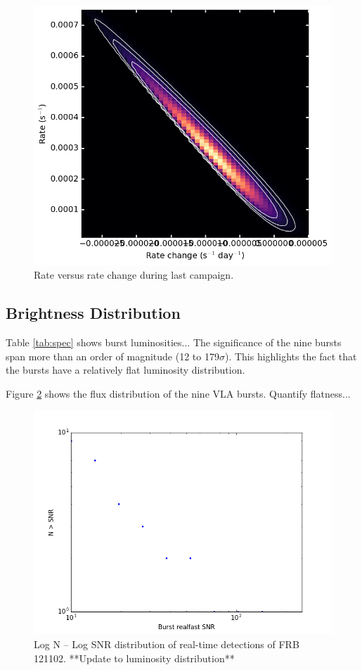 \documentclass[twocolumn]{aastex61}
\begin{document}
\begin{figure}[htb]
\begin{center}
\includegraphics[width=0.9\columnwidth]{event_rate_contours}
\caption{Rate versus rate change during last campaign.
\label{fig:rate}}
\end{center}
\end{figure}

\subsection{Brightness Distribution}
Table \ref{tab:spec} shows burst luminosities...
The significance of the nine bursts span more than an order of magnitude (12 to 179$\sigma$). This highlights the fact that the bursts have a relatively flat luminosity distribution.

Figure \ref{fig:logns} shows the flux distribution of the nine VLA bursts. Quantify flatness...

\begin{figure}[htb]
\begin{center}
\includegraphics[width=0.9\columnwidth]{logns}
\caption{Log N -- Log SNR distribution of real-time detections of FRB 121102. **Update to luminosity distribution**
\label{fig:logns}}
\end{center}
\end{figure}
\end{document}
